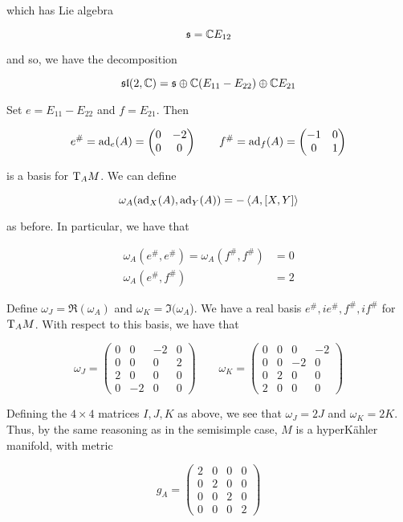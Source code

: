 \documentclass{article}
\renewcommand{\sl}{\mathfrak{sl}}
\begin{document}
which has Lie algebra

\[\mathfrak{s} = \mathbb{C} E_{12}\]

and so, we have the decomposition

\[\sl(2, \C) = \mfs \oplus \C(E_{11} - E_{22}) \oplus \C E_{21}\]

Set \(e = E_{11} - E_{22}\) and \(f = E_{21}\). Then

\[e^\# = \operatorname{ad}_e(A) = \begin{pmatrix}
    0 & -2 \\ 0 & 0
\end{pmatrix} \qquad f^\# = \operatorname{ad}_f(A) = \begin{pmatrix}
    -1 & 0 \\ 0 & 1
\end{pmatrix}\]

is a basis for \(\mathrm{T}_A M\). We can define

\[\omega_A(\operatorname{ad}_X(A), \operatorname{ad}_Y(A)) = -\left\langle A, [X, Y] \right\rangle\]

as before. In particular, we have that

\begin{align*}
    \omega_A(e^\#, e^\#) = \omega_A(f^\#, f^\#) &= 0 \\
    \omega_A(e^\#, f^\#) &= 2
\end{align*}

Define \(\omega_J = \Re(\omega_A)\) and \(\omega_K = \Im(\omega_A\)). We have a real basis \(e^\#, ie^\#, f^\#, if^\#\) for \(\mathrm{T}_A M\). With respect to this basis, we have that

\[\omega_J = \begin{pmatrix}
    0 & 0 & -2 & 0 \\
    0 & 0 & 0 & 2 \\
    2 & 0 & 0 & 0 \\
    0 & -2 & 0 & 0
\end{pmatrix} \qquad \omega_K = \begin{pmatrix}
    0 & 0 & 0 & -2 \\
    0 & 0 & -2 & 0 \\
    0 & 2 & 0 & 0 \\
    2 & 0 & 0 & 0
\end{pmatrix}\]

Defining the \(4 \times 4\) matrices \(I, J, K\) as above, we see that \(\omega_J = 2J\) and \(\omega_K = 2K\). Thus, by the same reasoning as in the semisimple case, \(M\) is a hyperK\"ahler manifold, with metric

\[g_A = \begin{pmatrix}
    2 & 0 & 0 & 0 \\
    0 & 2 & 0 & 0 \\
    0 & 0 & 2 & 0 \\
    0 & 0 & 0 & 2
\end{pmatrix}\]
\end{document}
